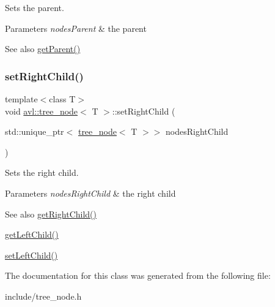 Sets the parent. 
\begin{DoxyParams}{Parameters}
{\em nodes\+Parent} & the parent \\
\hline
\end{DoxyParams}
\begin{DoxySeeAlso}{See also}
\hyperlink{classavl_1_1tree__node_a3350faeaf03433fc236ffe811b41b04f}{get\+Parent()} 
\end{DoxySeeAlso}
\mbox{\label{classavl_1_1tree__node_a8b36f21d28a09858e32ba9f1b349994f}} 
\subsubsection{\texorpdfstring{set\+Right\+Child()}{setRightChild()}}
{\footnotesize\ttfamily template$<$class T$>$ \\
void \hyperlink{classavl_1_1tree__node}{avl\+::tree\+\_\+node}$<$ T $>$\+::set\+Right\+Child (\begin{DoxyParamCaption}\item[{std\+::unique\+\_\+ptr$<$ \hyperlink{classavl_1_1tree__node}{tree\+\_\+node}$<$ T $>$$>$}]{nodes\+Right\+Child }\end{DoxyParamCaption})\hspace{0.3cm}{\ttfamily [inline]}}

Sets the right child. 
\begin{DoxyParams}{Parameters}
{\em nodes\+Right\+Child} & the right child \\
\hline
\end{DoxyParams}
\begin{DoxySeeAlso}{See also}
\hyperlink{classavl_1_1tree__node_ac79592e64351573e622d0977002fc813}{get\+Right\+Child()} 

\hyperlink{classavl_1_1tree__node_ad12a5f6a41cfc6203913c5b6bce30837}{get\+Left\+Child()} 

\hyperlink{classavl_1_1tree__node_acb0fbbc7cca1f2b18e72fb728be23979}{set\+Left\+Child()} 
\end{DoxySeeAlso}


The documentation for this class was generated from the following file\+:\begin{DoxyCompactItemize}
\item 
include/tree\+\_\+node.\+h\end{DoxyCompactItemize}
